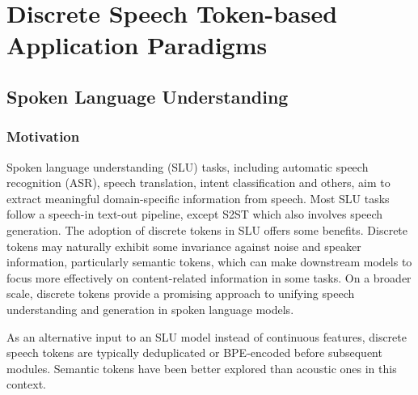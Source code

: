 
\section{Discrete Speech Token-based Application Paradigms}
\label{sec:application}


\subsection{Spoken Language Understanding}
\subsubsection{Motivation}
Spoken language understanding (SLU) tasks, including automatic speech recognition (ASR), speech translation, intent classification and others, aim to extract meaningful domain-specific information from speech.
Most SLU tasks follow a speech-in text-out pipeline, except S2ST which also involves speech generation.
The adoption of discrete tokens in SLU offers some benefits. 
Discrete tokens may naturally exhibit some invariance against noise and speaker information, particularly semantic tokens, which can make downstream models to focus more effectively on content-related information in some tasks.
On a broader scale, discrete tokens provide a promising approach to unifying speech understanding and generation in spoken language models.

As an alternative input to an SLU model instead of continuous features, discrete speech tokens are typically deduplicated or BPE-encoded before subsequent modules.
Semantic tokens have been better explored than acoustic ones in this context.

